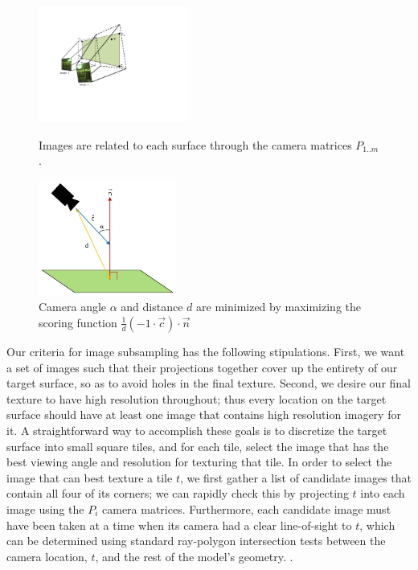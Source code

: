 \documentclass[]{spie}  %
\begin{document}
\begin{figure}
  \begin{minipage}[b]{0.45\linewidth}
    \centering
    \includegraphics[height=1.5in]{Projection.pdf}
    \caption{Images are related to each surface through the camera
      matrices $P_{1..m}$. }
    \label{fig:projection}
  \end{minipage}
  \hspace{0.5cm}
  \begin{minipage}[b]{0.45\linewidth}
    \centering
    \includegraphics[height=1.5in]{scoringFunction.jpg}
    \caption{Camera angle $\alpha$ and distance $d$ are minimized by
      maximizing the scoring function $\frac{1}{d} (-1 \cdot \vec{c})
      \cdot \vec{n}$}
    \label{fig:scoringFunction}
  \end{minipage}
\end{figure}


Our criteria for image subsampling has the following
stipulations. First, we want a set of images such that their
projections together cover up the entirety of our target surface, so
as to avoid holes in the final texture. Second, we desire our final
texture to have high resolution throughout; thus every location on the
target surface should have at least one image that contains high
resolution imagery for it. A straightforward way to accomplish these
goals is to discretize the target surface into small square tiles, and
for each tile, select the image that has the best viewing angle and
resolution for texturing that tile. In order to select the image that
can best texture a tile $t$, we first gather a list of candidate
images that contain all four of its corners; we can rapidly check this
by projecting $t$ into each image using the $P_i$ camera
matrices. Furthermore, each candidate image must have been taken at a
time when its camera had a clear line-of-sight to $t$, which can be
determined using standard ray-polygon intersection tests between the
camera location, $t$, and the rest of the model's geometry.
\cite{rayintersection}.
\end{document}
